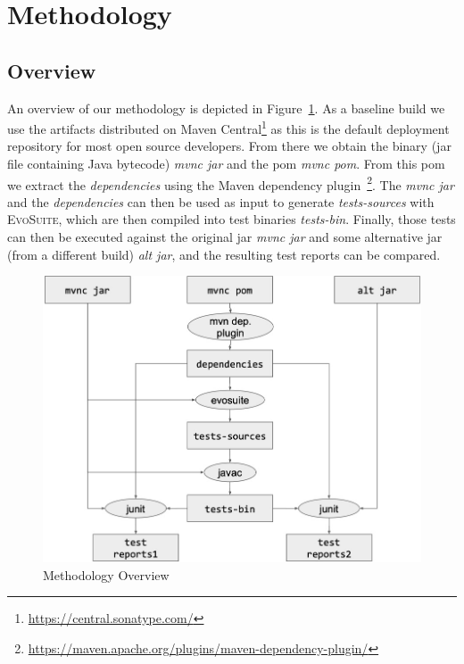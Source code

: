 \documentclass[conference]{IEEEtran}
\makeatletter
\newcommand{\evosuite}{\textsc{EvoSuite}\@\xspace}
\makeatother
\begin{document}
\section{Methodology}
\label{sec:methodology}


\subsection{Overview}

An overview of our methodology is depicted in Figure~\ref{fig:methodology}.  As a baseline build we use the artifacts distributed on Maven Central\footnote{\url{https://central.sonatype.com/}} as this is the default deployment repository for most open source developers.  From there we obtain the binary (jar file containing Java bytecode) \textit{mvnc jar} and the pom \textit{mvnc pom}. From this pom we extract the \textit{dependencies} using the Maven dependency plugin~\footnote{\url{https://maven.apache.org/plugins/maven-dependency-plugin/}}.  The \textit{mvnc jar} and the \textit{dependencies} can then be used as input to generate \textit{tests-sources} with \evosuite, which are then compiled into test binaries \textit{tests-bin}.  Finally, those tests can then be executed against the original jar \textit{mvnc jar} and some alternative jar (from a different build) \textit{alt jar}, and the resulting test reports can be compared.

\begin{figure}[ht!]
	\centering
	\includegraphics[width=\columnwidth]{methodology.jpg}
	\caption{Methodology Overview \label{fig:methodology}}
\end{figure}
\end{document}
